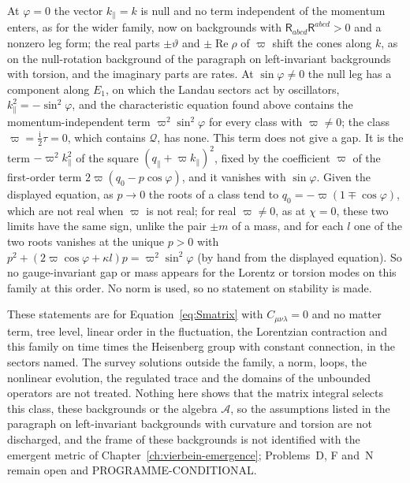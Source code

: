 At \(\varphi=0\) the vector \(k_\parallel=k\) is null and no term independent of the momentum enters, as for the wider family, now on backgrounds with \(\mathsf R_{abcd}\mathsf R^{abcd}>0\) and a nonzero leg form; the real parts \(\pm\vartheta\) and \(\pm\operatorname{Re}\rho\) of \(\varpi\) shift the cones along \(k\), as on the null-rotation background of the paragraph on left-invariant backgrounds with torsion, and the imaginary parts are rates. At \(\sin\varphi\neq0\) the null leg has a component along \(E_1\), on which the Landau sectors act by oscillators, \(k_\parallel^2=-\sin^2\varphi\), and the characteristic equation found above contains the momentum-independent term \(\varpi^2\sin^2\varphi\) for every class with \(\varpi\neq0\); the class \(\varpi=\tfrac{\mathrm i}2\tau=0\), which contains \(\mathcal Q\), has none. This term does not give a gap. It is the term \(-\varpi^2k_\parallel^2\) of the square \((q_\parallel+\varpi k_\parallel)^2\), fixed by the coefficient \(\varpi\) of the first-order term \(2\varpi(q_0-p\cos\varphi)\), and it vanishes with \(\sin\varphi\). Given the displayed equation, as \(p\to0\) the roots of a class tend to \(q_0=-\varpi(1\mp\cos\varphi)\), which are not real when \(\varpi\) is not real; for real \(\varpi\neq0\), as at \(\chi=0\), these two limits have the same sign, unlike the pair \(\pm m\) of a mass, and for each \(l\) one of the two roots vanishes at the unique \(p>0\) with \(p^2+(2\varpi\cos\varphi+\kappa l)p=\varpi^2\sin^2\varphi\) (by hand from the displayed equation). So no gauge-invariant gap or mass appears for the Lorentz or torsion modes on this family at this order. No norm is used, so no statement on stability is made.

These statements are for Equation~\eqref{eq:Smatrix} with \(C_{\mu\nu\lambda}=0\) and no matter term, tree level, linear order in the fluctuation, the Lorentzian contraction and this family on time times the Heisenberg group with constant connection, in the sectors named. The survey solutions outside the family, a norm, loops, the nonlinear evolution, the regulated trace and the domains of the unbounded operators are not treated. Nothing here shows that the matrix integral selects this class, these backgrounds or the algebra \(\mathcal A\), so the assumptions listed in the paragraph on left-invariant backgrounds with curvature and torsion are not discharged, and the frame of these backgrounds is not identified with the emergent metric of Chapter~\ref{ch:vierbein-emergence}; Problems~D, F and~N remain open and PROGRAMME-CONDITIONAL.
